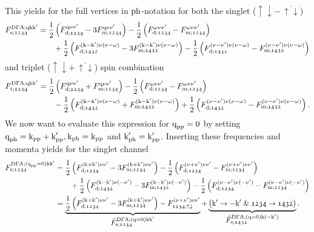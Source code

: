 \documentclass[main.tex]{subfiles}
\begin{document}
This yields for the full vertices in $\text{ph}$-notation for both the singlet ($\uparrow\downarrow-\,\overline{\uparrow\downarrow}$)
\begin{align}
\begin{split}
	F_{\text{s};\mathfrak{1234}}^{\text{D}\Gamma\text{A};\text{q}\text{k}\text{k}'}&=\frac12\left (F_{\text{d};\mathfrak{1234}}^{\text{q}\nu\nu'}-3F_{\text{m};\mathfrak{1234}}^{\text{q}\nu\nu'}\right )-\frac12\left (F_{\text{d};\mathfrak{1234}}^{\omega\nu\nu'}-F_{\text{m};\mathfrak{1234}}^{\omega\nu\nu'}\right )\\
	&\qquad+\frac12\left (F_{\text{d};\mathfrak{1432}}^{(\text{k}-\text{k}')\nu(\nu-\omega)}-3F_{\text{m};\mathfrak{1432}}^{(\text{k}-\text{k}')\nu(\nu-\omega)}\right )-\frac12\left (F_{\text{d};\mathfrak{1432}}^{(\nu-\nu')\nu(\nu-\omega)}-F_{\text{m};\mathfrak{1432}}^{(\nu-\nu')\nu(\nu-\omega)}\right )
\end{split}
\end{align}
and triplet ($\uparrow\downarrow+\,\overline{\uparrow\downarrow}$) spin combination
\begin{align}
\begin{split}
	F_{\text{t};\mathfrak{1234}}^{\text{D}\Gamma\text{A};\text{q}\text{k}\text{k}'}&=\frac12\left (F_{\text{d};\mathfrak{1234}}^{\text{q}\nu\nu'}+F_{\text{m};\mathfrak{1234}}^{\text{q}\nu\nu'}\right )-\frac12\left (F_{\text{d};\mathfrak{1234}}^{\omega\nu\nu'}-F_{\text{m};\mathfrak{1234}}^{\omega\nu\nu'}\right )\\
	&\qquad-\frac12\left (F_{\text{d};\mathfrak{1432}}^{(\text{k}-\text{k}')\nu(\nu-\omega)}+F_{\text{m};\mathfrak{1432}}^{(\text{k}-\text{k}')\nu(\nu-\omega)}\right )+\frac12\left (F_{\text{d};\mathfrak{1432}}^{(\nu-\nu')\nu(\nu-\omega)}-F_{\text{m};\mathfrak{1432}}^{(\nu-\nu')\nu(\nu-\omega)}\right ).
\end{split}
\end{align}
We now want to evaluate this expression for $\text{q}_{\text{pp}}=0$ by setting $\text{q}_{\text{ph}}=\text{k}_{\text{pp}}+\text{k}'_{\text{pp}}, \text{k}_{\text{ph}}=\text{k}_{\text{pp}}$ and $\text{k}'_{\text{ph}}=\text{k}'_{\text{pp}}$. Inserting these frequencies and momenta yields for the singlet channel
\begin{align}\label{eq:ladder_f_sing}
\begin{split}
	F_{\text{s};\mathfrak{1234}}^{\text{D}\Gamma\text{A};(\text{q}_{\text{pp}}=0)\text{k}\text{k}'}&=\frac12\left (F_{\text{d};\mathfrak{1234}}^{(\text{k}+\text{k}')\nu\nu'}-3F_{\text{m};\mathfrak{1234}}^{(\text{k}+\text{k}')\nu\nu'}\right )-\frac12\left (F_{\text{d};\mathfrak{1234}}^{(\nu+\nu')\nu\nu'}-F_{\text{m};\mathfrak{1234}}^{(\nu+\nu')\nu\nu'}\right )\\
	&\qquad+\frac12\left (F_{\text{d};\mathfrak{1432}}^{(\text{k}-\text{k}')\nu(-\nu')}-3F_{\text{m};\mathfrak{1432}}^{(\text{k}-\text{k}')\nu(-\nu')}\right )-\frac12\left (F_{\text{d};\mathfrak{1234}}^{(\nu-\nu')\nu(-\nu')}-F_{\text{m};\mathfrak{1234}}^{(\nu-\nu')\nu(-\nu')}\right )\\
	&=\underbrace{\frac12\left (F_{\text{d};\mathfrak{1234}}^{(\text{k}+\text{k}')\nu\nu'}-3F_{\text{m};\mathfrak{1234}}^{(\text{k}+\text{k}')\nu\nu'}\right )-F_{\mathfrak{1234};\uparrow\downarrow}^{(\nu+\nu')\nu\nu'}}_{\textstyle\tilde{F}_{\text{s};\mathfrak{1234}}^{\text{D}\Gamma\text{A};(\text{q}=0)\text{k}\text{k}'}}+ \underbrace{\left (\text{k}'\rightarrow -\text{k}'\;\&\; \mathfrak{1234}\rightarrow\mathfrak{1432}\right )}_{\textstyle\tilde{F}_{\text{s};\mathfrak{1432}}^{\text{D}\Gamma\text{A};(\text{q}=0)\text{k}(-\text{k}')}}.
\end{split}
\end{align}
\end{document}

